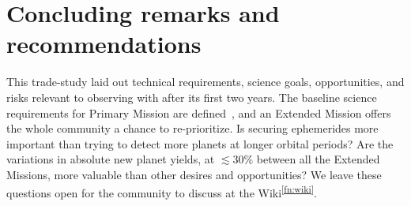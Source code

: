 \section{Concluding remarks and recommendations}
\label{sec:conclusions}

This trade-study laid out technical requirements, science goals, opportunities, and risks relevant to observing with \tess after its first two years.
The baseline science requirements for \tesss Primary Mission are 
defined~\citep{ricker_transiting_2014}, and an Extended Mission offers the
whole community a chance to re-prioritize.
Is securing \tesss ephemerides more important than trying to detect more
planets at longer orbital periods? 
Are the variations in absolute new planet yields, at $\lesssim30\%$ between all 
the Extended Missions, more valuable than other desires and opportunities?
We leave these questions open for the community to discuss at the \tess 
Wiki\textsuperscript{\ref{fn:wiki}}.


